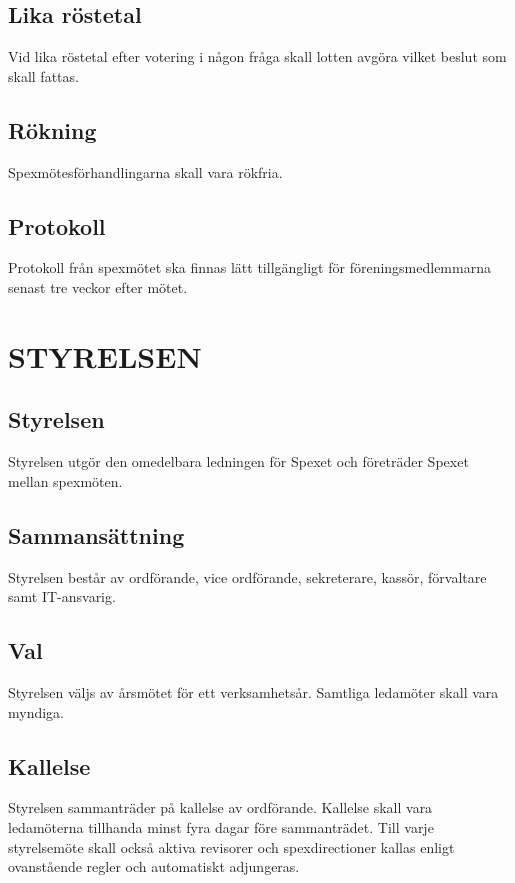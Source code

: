 \documentclass[a4paper]{article}
\begin{document}
\subsection{Lika röstetal}
Vid lika röstetal efter votering i någon fråga skall lotten avgöra vilket beslut som skall fattas.

\subsection{Rökning}
Spexmötesförhandlingarna skall vara rökfria.

\subsection{Protokoll}
Protokoll från spexmötet ska finnas lätt tillgängligt för föreningsmedlemmarna senast tre veckor efter mötet.

\section{STYRELSEN}
\label{section:styrelsen}

\subsection{Styrelsen}
Styrelsen utgör den omedelbara ledningen för Spexet och företräder Spexet mellan spexmöten.

\subsection{Sammansättning}
Styrelsen består av ordförande, vice ordförande, sekreterare, kassör, förvaltare samt IT-ansvarig.

\subsection{Val}
Styrelsen väljs av årsmötet för ett verksamhetsår. Samtliga ledamöter skall vara myndiga.

\subsection{Kallelse}
Styrelsen sammanträder på kallelse av ordförande. Kallelse skall vara ledamöterna tillhanda minst fyra dagar före sammanträdet. Till varje styrelsemöte skall också aktiva revisorer och spexdirectioner kallas enligt ovanstående regler och automatiskt adjungeras.
\end{document}
